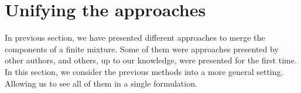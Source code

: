 \documentclass[10pt, a4paper]{article}
\newcommand{\m}[1]{\boldsymbol{#1}}
\begin{document}

%







\section{Unifying the approaches}
\label{confusion}

In previous section, we have presented different approaches to merge the components of a finite mixture. Some of them were approaches presented by other authors, and others, up to our knowledge, were presented for the first time. In this section, we consider the previous methods into a more general setting. Allowing us to see all of them in a single formulation.
\end{document}
